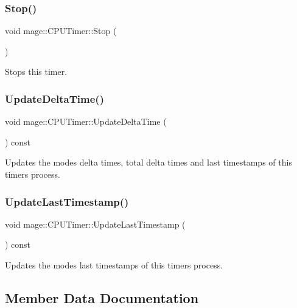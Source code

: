 \subsubsection{\texorpdfstring{Stop()}{Stop()}}
{\footnotesize\ttfamily void mage\+::\+C\+P\+U\+Timer\+::\+Stop (\begin{DoxyParamCaption}{ }\end{DoxyParamCaption})}

Stops this timer. \hypertarget{classmage_1_1_c_p_u_timer_afd5e90ee6e0ad80257bbf6babc440f3b}{}\label{classmage_1_1_c_p_u_timer_afd5e90ee6e0ad80257bbf6babc440f3b} 
\subsubsection{\texorpdfstring{Update\+Delta\+Time()}{UpdateDeltaTime()}}
{\footnotesize\ttfamily void mage\+::\+C\+P\+U\+Timer\+::\+Update\+Delta\+Time (\begin{DoxyParamCaption}{ }\end{DoxyParamCaption}) const\hspace{0.3cm}{\ttfamily [private]}}

Updates the modes\textquotesingle{} delta times, total delta times and last timestamps of this timer\textquotesingle{}s process. \hypertarget{classmage_1_1_c_p_u_timer_a1e81db9e1df52fbdf89b042b3611cd80}{}\label{classmage_1_1_c_p_u_timer_a1e81db9e1df52fbdf89b042b3611cd80} 
\subsubsection{\texorpdfstring{Update\+Last\+Timestamp()}{UpdateLastTimestamp()}}
{\footnotesize\ttfamily void mage\+::\+C\+P\+U\+Timer\+::\+Update\+Last\+Timestamp (\begin{DoxyParamCaption}{ }\end{DoxyParamCaption}) const\hspace{0.3cm}{\ttfamily [private]}}

Updates the modes\textquotesingle{} last timestamps of this timer\textquotesingle{}s process. 

\subsection{Member Data Documentation}
\hypertarget{classmage_1_1_c_p_u_timer_a7b7710e7f3b165283fad15eb0c93b96a}{}\label{classmage_1_1_c_p_u_timer_a7b7710e7f3b165283fad15eb0c93b96a} 
